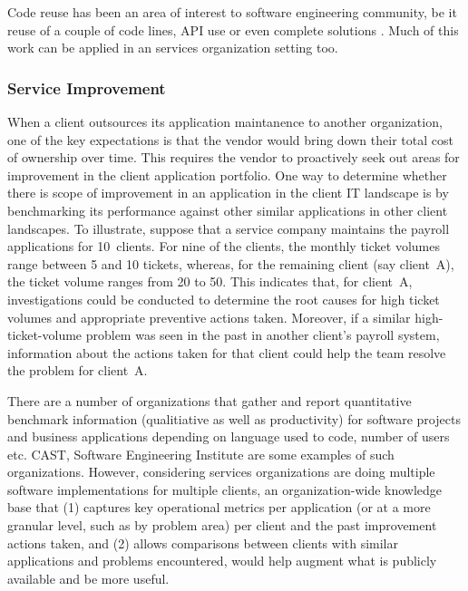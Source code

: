 Code reuse has been an area of interest to software engineering community, be it reuse of a couple of code lines, API use or even complete solutions \cite{Reiss:2009,Holmes:2013}. Much of this work can be applied in an services organization setting too.

\subsubsection{Service Improvement}

When a client outsources its application maintanence to another organization,
one of the key expectations is that the vendor would bring down their total cost
of ownership over time. This requires the vendor to proactively seek out areas
for improvement in the client application portfolio. One way to determine
whether there is scope of improvement in an application in the client IT
landscape is by benchmarking its performance against other similar applications
in other client landscapes. To illustrate, suppose that a service company
maintains the payroll applications for 10~clients. For nine of the clients, the
monthly ticket volumes range between 5 and 10 tickets, whereas, for the
remaining client (say client~A), the ticket volume ranges from 20 to 50. This
indicates that, for client~A, investigations could be conducted to determine the
root causes for high ticket volumes and appropriate preventive actions
taken. Moreover, if a similar high-ticket-volume problem was seen in the past in
another client's payroll system, information about the actions taken for that
client could help the team resolve the problem for client~A.

There are a number of organizations that gather and report quantitative benchmark information (qualitiative as well as productivity) for software projects and business applications depending on language used to code, number of users etc. CAST, Software Engineering Institute are some examples of such organizations. However, considering services organizations are doing multiple software implementations for multiple clients, an organization-wide knowledge base that (1) captures key
operational metrics per application (or at a more granular level, such as by
problem area) per client and the past improvement actions taken, and (2) allows
comparisons between clients with similar applications and problems encountered,
would help augment what is publicly available and be more useful.


